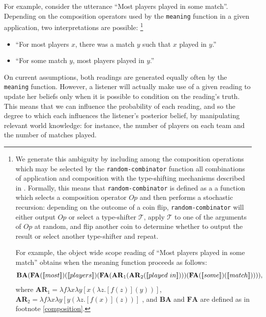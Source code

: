 \documentclass[12pt]{article}
\newcommand{\llbracket}{\ensuremath{\left [\!\left [}}%
\newcommand{\rrbracket}{\ensuremath{\right ]\!\right ]}}
\providecommand{\sv}[1]{\ensuremath{\llbracket #1 \rrbracket}}
\begin{document}
For example, consider the utterance ``Most players played in some match''. 
Depending on the composition operators used by the \lstinline{meaning} function in a given application, two interpretations are possible:
\footnote{
We generate this ambiguity by including among the composition operations which may be selected by the \lstinline{random-combinator} function all combinations of application and composition with the type-shifting mechanisms described in \citet{hendriks93,barker05}.
Formally, this means that \lstinline{random-combinator} is defined as a a function which selects a composition operator $\mathit{Op}$ and then performs a stochastic recursion: depending on the outcome of a coin flip, \lstinline{random-combinator} will either output $\mathit{Op}$ or select a type-shifter $\mathcal{T}$, apply $\mathcal{T}$ to one of the arguments of $\mathit{Op}$ at random, and flip another coin to determine whether to output the result or select another type-shifter and repeat.

For example, the object wide scope reading of ``Most players played in some match'' obtains when the meaning function proceeds as follows: 
$$
\mathbf{BA}(\mathbf{FA}(\sv{most})(\sv{players})
(\mathbf{FA}(\mathbf{AR}_1(\mathbf{AR}_2(\sv{played\ in})))
(\mathbf{FA}(\sv{some})(\sv{match})))),
$$  
where $\mathbf{AR}_1 = \lambda f \lambda x \lambda y [x(\lambda z . [f(z)] (y))]$, $\mathbf{AR}_2 = \lambda f \lambda x \lambda y [y(\lambda z . [f(x)] (z))]$ \cite[cf.][pp.453ff.]{barker05}, and $\mathbf{BA}$ and $\mathbf{FA}$ are defined as in footnote \ref{composition}.
}
\begin{itemize}
\item ``For most players $x$, there was a match $y$ such that $x$ played in $y$.'' 
\item ``For some match $y$, most players played in $y$.''
\end{itemize}
On current assumptions, both readings are generated equally often by the \lstinline{meaning} function. 
However, a listener will actually make use of a given reading to update her beliefs only when it is possible to condition on the reading's truth. 
This means that we can influence the probability of each reading, and so the degree to which each influences the listener's posterior belief, by manipulating relevant world knowledge: for instance, the number of players on each team and the number of matches played.
\end{document}
